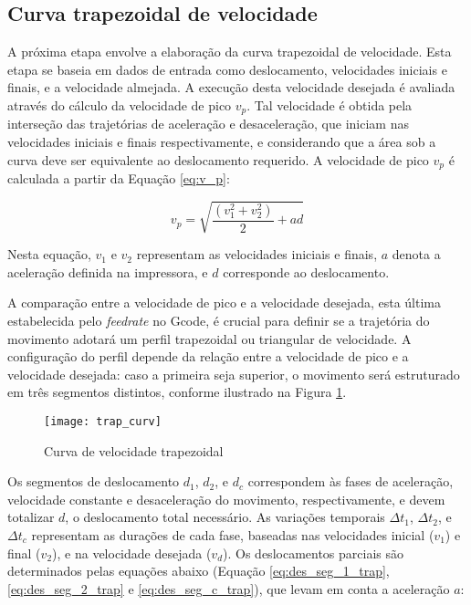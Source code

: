 \subsection{Curva trapezoidal de velocidade}

A próxima etapa  envolve a elaboração da curva trapezoidal de velocidade. Esta etapa se baseia em dados de entrada como deslocamento, velocidades iniciais e finais, e a velocidade almejada. A execução desta velocidade desejada é avaliada através do cálculo da velocidade de pico \(v_p\). Tal velocidade é obtida pela interseção das trajetórias de aceleração e desaceleração, que iniciam nas velocidades iniciais e finais respectivamente, e considerando que a área sob a curva deve ser equivalente ao deslocamento requerido. A velocidade de pico \(v_p\) é calculada a partir da Equação \ref{eq:v_p}:

\begin{equation}
    \label{eq:v_p}
    v_p = \sqrt{\frac{(v_1^2+v_2^2)}{2}+a d}
\end{equation}

Nesta equação, \(v_1\) e \(v_2\) representam as velocidades iniciais e finais, \(a\) denota a aceleração definida na impressora, e \(d\) corresponde ao deslocamento.

A comparação entre a velocidade de pico e a velocidade desejada, esta última estabelecida pelo \textit{feedrate} no Gcode, é crucial para definir se a trajetória do movimento adotará um perfil trapezoidal ou triangular de velocidade. A configuração do perfil depende da relação entre a velocidade de pico e a velocidade desejada: caso a primeira seja superior, o movimento será estruturado em três segmentos distintos, conforme ilustrado na Figura \ref{fig:trap_curv}.

\begin{figure}[H]
    \centering
    \caption{Curva de velocidade trapezoidal}
    \texttt{[image: trap\_curv]}
    \label{fig:trap_curv}
\end{figure}

Os segmentos de deslocamento \(d_1\), \(d_2\), e \(d_c\) correspondem às fases de aceleração, velocidade constante e desaceleração do movimento, respectivamente, e devem totalizar \(d\), o deslocamento total necessário. As variações temporais \(\Delta t_1\), \(\Delta t_2\), e \(\Delta t_c\) representam as durações de cada fase, baseadas nas velocidades inicial (\(v_1\)) e final (\(v_2\)), e na velocidade desejada (\(v_d\)). Os deslocamentos parciais são determinados pelas equações abaixo (Equação \ref{eq:des_seg_1_trap},  \ref{eq:des_seg_2_trap} e  \ref{eq:des_seg_c_trap}), que levam em conta a aceleração \(a\):

